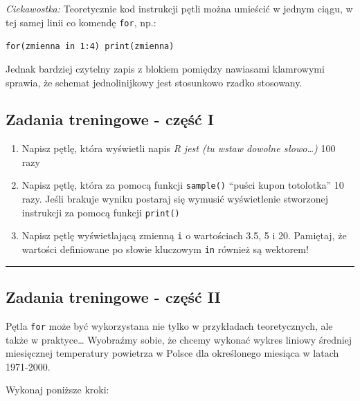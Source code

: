 \documentclass[]{book}
\providecommand{\tightlist}{%
  \setlength{\itemsep}{0pt}\setlength{\parskip}{0pt}}
\theoremstyle{definition}
\theoremstyle{definition}
\theoremstyle{definition}
\theoremstyle{remark}
\begin{document}
\emph{Ciekawostka:} Teoretycznie kod instrukcji pętli można umieścić w
jednym ciągu, w tej samej linii co komendę \texttt{for}, np.:

\texttt{for(zmienna\ in\ 1:4)\ print(zmienna)}

Jednak bardziej czytelny zapis z blokiem pomiędzy nawiasami klamrowymi
sprawia, że schemat jednolinijkowy jest stosunkowo rzadko stosowany.

\subsection{Zadania treningowe - część
I}\label{zadania-treningowe---czesc-i}

\begin{enumerate}
\def\labelenumi{\arabic{enumi}.}
\tightlist
\item
  Napisz pętlę, która wyświetli napis \emph{R jest (tu wstaw dowolne
  słowo\ldots{})} 100 razy
\item
  Napisz pętlę, która za pomocą funkcji \texttt{sample()} ``puści kupon
  totolotka'' 10 razy. Jeśli brakuje wyniku postaraj się wymusić
  wyświetlenie stworzonej instrukcji za pomocą funkcji \texttt{print()}
\item
  Napisz pętlę wyświetlającą zmienną \texttt{i} o wartościach 3.5, 5 i
  20. Pamiętaj, że wartości definiowane po słowie kluczowym \texttt{in}
  również są wektorem!
\end{enumerate}

\begin{center}\rule{0.5\linewidth}{\linethickness}\end{center}

\subsection{Zadania treningowe - część
II}\label{zadania-treningowe---czesc-ii}

Pętla \texttt{for} może być wykorzystana nie tylko w przykładach
teoretycznych, ale także w praktyce\ldots{} Wyobraźmy sobie, że chcemy
wykonać wykres liniowy średniej miesięcznej temperatury powietrza w
Polsce dla określonego miesiąca w latach 1971-2000.

Wykonaj poniższe kroki:
\end{document}
